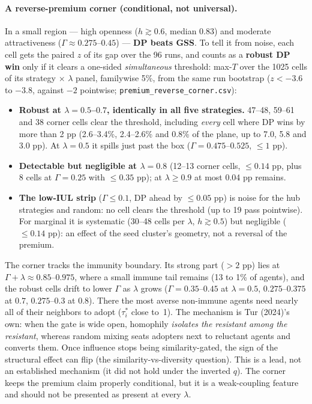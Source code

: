\documentclass[11pt,a4paper]{article}
\newcommand{\code}[1]{\texttt{#1}}
\begin{document}
\paragraph{A reverse-premium corner (conditional, not universal).} In a small region ---
high openness ($h \gtrsim 0.6$, median 0.83) and moderate attractiveness
($\Gamma \approx 0.275$--$0.45$) --- \textbf{DP beats GSS}. To tell it from noise, each
cell gets the paired $z$ of its gap over the 96 runs, and counts as a \textbf{robust DP win}
only if it clears a one-sided \emph{simultaneous} threshold: max-$T$ over the 1025 cells of
its strategy $\times$ $\lambda$ panel, familywise 5\%, from the same run bootstrap
($z < -3.6$ to $-3.8$, against $-2$ pointwise; \code{premium\_reverse\_corner.csv}):
\begin{itemize}
  \item \textbf{Robust at $\lambda = 0.5$--$0.7$, identically in all five strategies.}
    47--48, 59--61 and 38 corner cells clear the threshold, including \emph{every} cell
    where DP wins by more than 2 pp (2.6--3.4\%, 2.4--2.6\% and 0.8\% of the plane, up to
    7.0, 5.8 and 3.0 pp). At $\lambda = 0.5$ it spills just past the box
    ($\Gamma = 0.475$--$0.525$, $\le 1$ pp).
  \item \textbf{Detectable but negligible at $\lambda = 0.8$} (12--13 corner cells,
    $\le 0.14$ pp, plus 8 cells at $\Gamma = 0.25$ with $\le 0.35$ pp); at
    $\lambda \ge 0.9$ at most 0.04 pp remains.
  \item \textbf{The low-IUL strip} ($\Gamma \le 0.1$, DP ahead by $\le 0.05$ pp) is noise
    for the hub strategies and random: no cell clears the threshold (up to 19 pass
    pointwise). For marginal it is systematic (30--48 cells per $\lambda$, $h \gtrsim
    0.5$) but negligible ($\le 0.14$ pp): an effect of the seed cluster's geometry, not a
    reversal of the premium.
\end{itemize}
The corner tracks the immunity boundary. Its strong part ($> 2$ pp) lies at
$\Gamma + \lambda \approx 0.85$--$0.975$, where a small immune tail remains (13 to 1\% of
agents), and the robust cells drift to lower $\Gamma$ as $\lambda$ grows
($\Gamma = 0.35$--$0.45$ at $\lambda = 0.5$, $0.275$--$0.375$ at $0.7$, $0.275$--$0.3$ at
$0.8$). There the most averse non-immune agents need nearly all of their neighbors to
adopt ($\tau_i^{*}$ close to~1). The mechanism is Tur (2024)'s own: when the gate is wide
open, homophily \emph{isolates the resistant among the resistant}, whereas random mixing
seats adopters next to reluctant agents and converts them. Once influence stops being
similarity-gated, the sign of the structural effect can flip (the similarity-vs-diversity
question). This is a lead, not an established mechanism (it did not hold under the inverted
$q$). The corner keeps the premium claim properly conditional, but it is a weak-coupling
feature and should not be presented as present at every $\lambda$.
\end{document}
